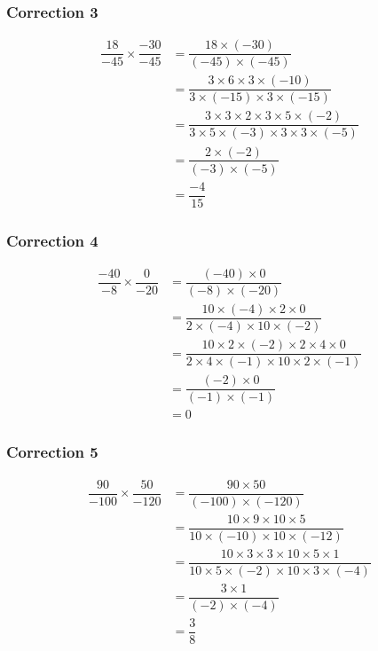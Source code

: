 \documentclass[15pt, mathserif]{beamer}
\begin{document}
\begin{frame}
\vspace{-10mm}
	\frametitle{Correction 3}
	\begin{align*}
	\dfrac{18}{-45} \times \dfrac{-30}{-45}&= \dfrac{18 \times \left(-30\right)}{\left(-45\right) \times \left(-45\right)}\\
		&=\dfrac{3 \times 6 \times 3 \times \left(-10\right)}{3 \times \left(-15\right) \times 3 \times \left(-15\right)}\\		&=\dfrac{3 \times 3 \times 2 \times 3 \times 5 \times \left(-2\right)}{3 \times 5 \times \left(-3\right) \times 3 \times 3 \times \left(-5\right)}\\		&=\dfrac{2 \times \left(-2\right)}{\left(-3\right) \times \left(-5\right)}\\		&=\dfrac{-4}{15}
	\end{align*}\end{frame}


\begin{frame}
\vspace{-10mm}
	\frametitle{Correction 4}
	\begin{align*}
	\dfrac{-40}{-8} \times \dfrac{0}{-20}&= \dfrac{\left(-40\right) \times 0}{\left(-8\right) \times \left(-20\right)}\\
		&=\dfrac{10 \times \left(-4\right) \times 2 \times 0}{2 \times \left(-4\right) \times 10 \times \left(-2\right)}\\		&=\dfrac{10 \times 2 \times \left(-2\right) \times 2 \times 4 \times 0}{2 \times 4 \times \left(-1\right) \times 10 \times 2 \times \left(-1\right)}\\		&=\dfrac{\left(-2\right) \times 0}{\left(-1\right) \times \left(-1\right)}\\		&=0
	\end{align*}\end{frame}


\begin{frame}
\vspace{-10mm}
	\frametitle{Correction 5}
	\begin{align*}
	\dfrac{90}{-100} \times \dfrac{50}{-120}&= \dfrac{90 \times 50}{\left(-100\right) \times \left(-120\right)}\\
		&=\dfrac{10 \times 9 \times 10 \times 5}{10 \times \left(-10\right) \times 10 \times \left(-12\right)}\\		&=\dfrac{10 \times 3 \times 3 \times 10 \times 5 \times 1}{10 \times 5 \times \left(-2\right) \times 10 \times 3 \times \left(-4\right)}\\		&=\dfrac{3 \times 1}{\left(-2\right) \times \left(-4\right)}\\		&=\dfrac{3}{8}
	\end{align*}\end{frame}
\end{document}
